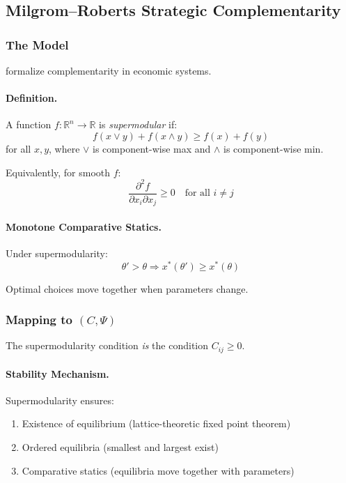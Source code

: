 \documentclass[12pt,a4paper]{article}
\begin{document}
\subsection{Milgrom--Roberts Strategic Complementarity}
\label{app:milgromroberts}

\subsubsection{The Model}

\citet{milgromroberts1990,milgromroberts1995} formalize complementarity in economic systems.

\paragraph{Definition.}
A function $f: \mathbb{R}^n \to \mathbb{R}$ is \emph{supermodular} if:
\begin{equation}
  f(x \vee y) + f(x \wedge y) \geq f(x) + f(y)
\end{equation}
for all $x, y$, where $\vee$ is component-wise max and $\wedge$ is component-wise min.

Equivalently, for smooth $f$:
\begin{equation}
  \frac{\partial^2 f}{\partial x_i \partial x_j} \geq 0 \quad \text{for all } i \neq j
\end{equation}

\paragraph{Monotone Comparative Statics.}
Under supermodularity:
\begin{equation}
  \theta' > \theta \Rightarrow x^*(\theta') \geq x^*(\theta)
\end{equation}

Optimal choices move together when parameters change.

\subsubsection{Mapping to $(C, \Psi)$}

The supermodularity condition \emph{is} the condition $C_{ij} \geq 0$.

\paragraph{Stability Mechanism.}
Supermodularity ensures:
\begin{enumerate}
  \item Existence of equilibrium (lattice-theoretic fixed point theorem)
  \item Ordered equilibria (smallest and largest exist)
  \item Comparative statics (equilibria move together with parameters)
\end{enumerate}
\end{document}
